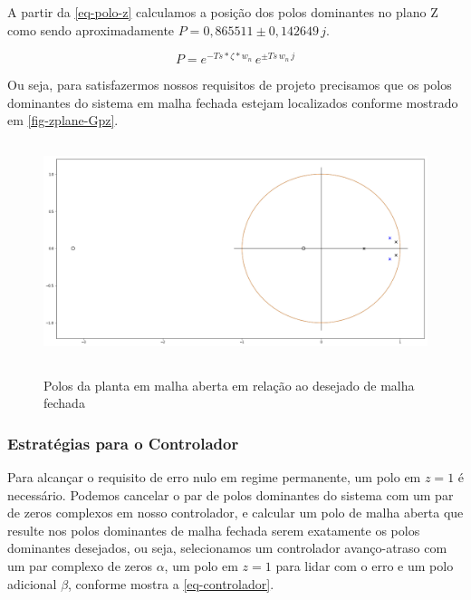 \documentclass[
	12pt,				%
	article,			%
	openright,			%
	oneside,
	a4paper,			%
	chapter=TITLE,		%
	section=TITLE,		%
	english,			%
	french,				%
	spanish,			%
	brazil,				%
]{abntex2}
\begin{document}
            	A partir da \autoref{eq-polo-z} calculamos a posição dos polos dominantes no plano Z como sendo aproximadamente $ P=0,865511 \pm 0,142649\,j $.
            	
            	\begin{equation}
            	    \label{eq-polo-z}
            	    P = e^{-Ts * \zeta * w_n} \, e^{\pm Ts\,w_n\,j}
            	\end{equation}
            	
            	Ou seja, para satisfazermos nossos requisitos de projeto precisamos que os polos dominantes do sistema em malha fechada estejam localizados conforme mostrado em \autoref{fig-zplane-Gpz}.
            	
            	\FloatBarrier
            	\begin{figure}[htbp]
                	\centering
                	\caption{Polos da planta em malha aberta em relação ao desejado de malha fechada}
                	\includegraphics[width=\textwidth,height=240px,keepaspectratio]{imgs/ftma/zplane-gpz.png}
                	\label{fig-zplane-Gpz}
            	\end{figure}
            	\FloatBarrier
    	
        	\subsubsection{Estratégias para o Controlador}
        	
            	Para alcançar o requisito de erro nulo em regime permanente, um polo em $z=1$ é necessário. 
            	Podemos cancelar o par de polos dominantes do sistema com um par de zeros complexos em nosso controlador, e calcular um polo de malha aberta que resulte nos polos dominantes de malha fechada serem exatamente os polos dominantes desejados, ou seja, selecionamos um controlador avanço-atraso com um par complexo de zeros $\alpha$, um polo em $z=1$ para lidar com o erro e um polo adicional $\beta$, conforme mostra a \autoref{eq-controlador}.
            	
\end{document}
